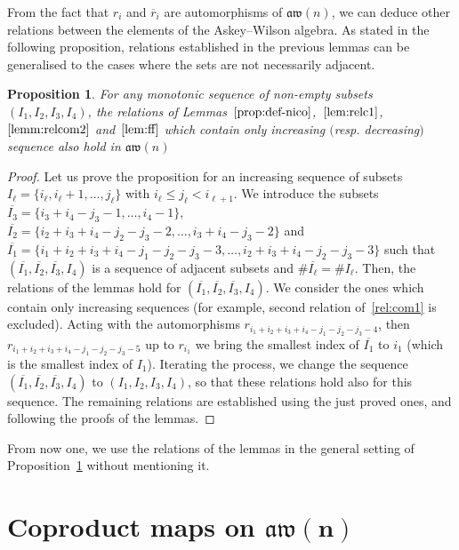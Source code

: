 \documentclass[pdftex]{sigma}
\numberwithin{equation}{section}
\newtheorem{prop}[theo]{Proposition}
\theoremstyle{definition}
\newcommand{\rb}{\overline{r}}
\newcommand{\aw}{\mathfrak{aw}(n)}
\begin{document}
From the fact that $r_i$ and $\rb_i$ are automorphisms of $\aw$, we can deduce other relations between the elements of the Askey--Wilson algebra.
As stated in the following proposition, relations established in the previous lemmas can be generalised to the cases where the sets are not necessarily adjacent.
\begin{prop}\label{prop:gen}
 For any monotonic sequence of non-empty subsets $(I_1,I_2,I_3,I_4)$, the relations of Lemmas~$\ref{prop:def-nico}$,~$\ref{lem:relc1}$,~$\ref{lemm:relcom2}$ and~$\ref{lem:ff}$
 which contain only increasing $($resp. decreasing$)$ sequence also hold in $\aw$
\end{prop}
\begin{proof}
Let us prove the proposition for an increasing sequence of subsets $I_\ell=\{i_\ell,i_\ell+1,\dots ,j_\ell\}$ with $i_\ell\leq j_\ell< i_{\ell+1}$.
We introduce the subsets $\overline{I_3}=\{i_3+i_4-j_3-1, \dots ,i_4-1\}$, $\overline{I_2}=\{i_2+i_3+i_4-j_2-j_3-2,\dots, i_3+i_4-j_3-2\}$ and $\overline{I_1}=\{i_1+i_2+i_3+i_4-j_1-j_2-j_3-3,\dots ,i_2+i_3+i_4-j_2-j_3-3\}$ such that
$(\overline{I_1},\overline{I_2},\overline{I_3},I_4)$ is a sequence of adjacent subsets and $\# \overline{I_\ell}=\# I_\ell$.
Then, the relations of the lemmas hold for $(\overline{I_1},\overline{I_2},\overline{I_3},I_4)$.
We consider the ones which contain only increasing sequences (for example, second relation of~\eqref{rel:com1} is excluded).
Acting with the automorphisms $r_{i_1+i_2+i_3+i_4-j_1-j_2-j_3-4}$, then $r_{i_1+i_2+i_3+i_4-j_1-j_2-j_3-5}$ up to $r_{i_1}$ we bring the smallest index of $\overline{I_1}$ to $i_1$ (which is the smallest index of $I_1$). Iterating the process, we change the sequence $(\overline{I_1},\overline{I_2},\overline{I_3},I_4)$ to $(I_1,I_2,I_3,I_4)$, so that these relations hold also
for this sequence. The remaining relations are established
 using the just proved ones, and following the proofs of the lemmas.
\end{proof}


From now one, we use the relations of the lemmas in the general setting of Proposition~\ref{prop:gen} without mentioning it.



\section[Coproduct maps on aw(n)]{Coproduct maps on $\boldsymbol{\aw}$}\label{sec-coproduct}
\end{document}
